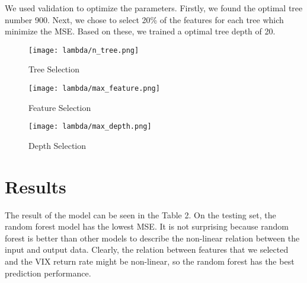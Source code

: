 \documentclass[fleqn,10pt]{SelfArx} %
\begin{document}
\noindent
We used validation to optimize the parameters. Firstly, we found the optimal tree number 900. Next, we chose to select 20\% of the features for each tree which minimize the MSE. Based on these, we trained a optimal tree depth of 20. 

\begin{figure}[ht]\centering %
\texttt{[image: lambda/n\_tree.png]}
\caption{Tree Selection}
\label{fig:view}
\end{figure}

\begin{figure}[ht]\centering %
\texttt{[image: lambda/max\_feature.png]}
\caption{Feature Selection}
\label{fig:view}
\end{figure}

\begin{figure}[ht]\centering %
\texttt{[image: lambda/max\_depth.png]}
\caption{Depth Selection}
\label{fig:view}
\end{figure}






\section{Results}

The result of the model can be seen in the Table 2. On the testing set, the random forest model has the lowest MSE. It is not surprising because random forest is better than other models to describe the non-linear relation between the input and output data. Clearly, the relation between features that we selected and the VIX return rate might be non-linear, so the random forest has the best prediction performance.
\end{document}

